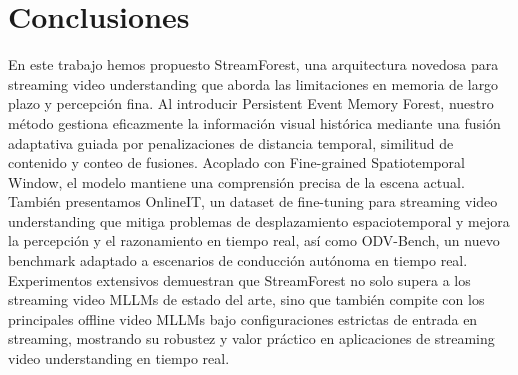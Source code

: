 \section{Conclusiones}
\label{sec:Conclusions}


En este trabajo hemos propuesto StreamForest, una arquitectura novedosa para streaming video understanding que aborda las limitaciones en memoria de largo plazo y percepción fina. Al introducir Persistent Event Memory Forest, nuestro método gestiona eficazmente la información visual histórica mediante una fusión adaptativa guiada por penalizaciones de distancia temporal, similitud de contenido y conteo de fusiones. Acoplado con Fine-grained Spatiotemporal Window, el modelo mantiene una comprensión precisa de la escena actual. También presentamos OnlineIT, un dataset de fine-tuning para streaming video understanding que mitiga problemas de desplazamiento espaciotemporal y mejora la percepción y el razonamiento en tiempo real, así como ODV-Bench, un nuevo benchmark adaptado a escenarios de conducción autónoma en tiempo real. Experimentos extensivos demuestran que StreamForest no solo supera a los streaming video MLLMs de estado del arte, sino que también compite con los principales offline video MLLMs bajo configuraciones estrictas de entrada en streaming, mostrando su robustez y valor práctico en aplicaciones de streaming video understanding en tiempo real.
